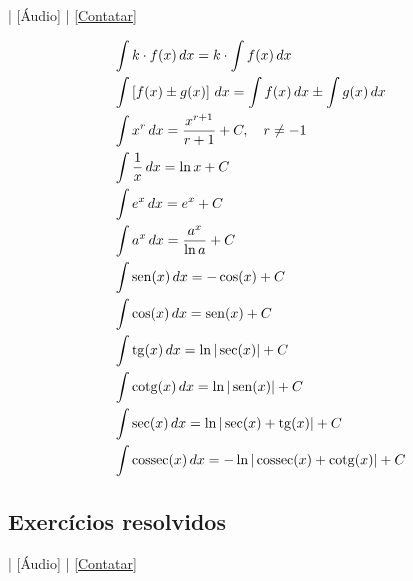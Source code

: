 \begin{flushright}
  [Vídeo] | [Áudio] | \href{https://phkonzen.github.io/notas/contato.html}{[Contatar]}
\end{flushright}

\begin{small}
\begin{align}
  & \int k\cdot f(x)\,dx = k\cdot\int f(x)\,dx\\
  & \int \left[f(x)\pm g(x)\right]\,dx = \int f(x)\,dx \pm \int g(x)\,dx\\
  & \int x^r\,dx = \frac{x^{r+1}}{r+1} + C,\quad r\neq -1\\
  & \int \frac{1}{x}\,dx = \ln x + C \\
  & \int e^x\,dx = e^x + C \\
  & \int a^x\,dx = \frac{a^x}{\ln a} + C \\
  & \int \operatorname{sen}(x)\,dx = -\cos(x) + C \\
  & \int \cos(x)\,dx = \operatorname{sen}(x) + C \\
  & \int \operatorname{tg}(x)\,dx = \ln|\sec(x)| + C \\
  & \int \operatorname{cotg}(x)\,dx = \ln|\operatorname{sen}(x)| + C \\
  & \int \sec(x)\,dx = \ln|\sec(x)+\operatorname{tg}(x)| + C \\
  & \int \operatorname{cossec}(x)\,dx = -\ln|\operatorname{cossec}(x)+\operatorname{cotg}(x)| + C
\end{align}
\end{small}


\subsection*{Exercícios resolvidos}

\begin{flushright}
  [Vídeo] | [Áudio] | \href{https://phkonzen.github.io/notas/contato.html}{[Contatar]}
\end{flushright}

